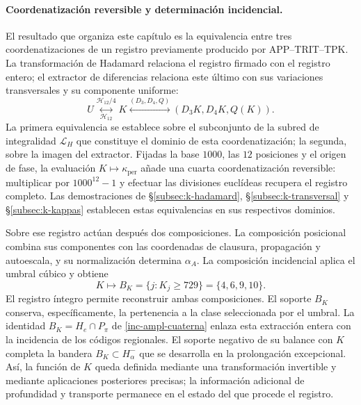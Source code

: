\paragraph{Coordenatización reversible y determinación incidencial.}
\label{ampl-alfa-k-intro-reversible}
El resultado que organiza este capítulo es la equivalencia entre tres
coordenatizaciones de un registro previamente producido por
APP--TRIT--TPK. La transformación de Hadamard relaciona el registro
firmado con el registro entero; el extractor de diferencias relaciona
este último con sus variaciones transversales y su componente uniforme:
\[
 U\underset{\mathcal H_{12}}{\overset{\mathcal H_{12}/4}{\longleftrightarrow}}K
 \overset{(D_3,D_4,Q)}{\longleftrightarrow}
 (D_3K,D_4K,Q(K)).
\]
La primera equivalencia se establece sobre el subconjunto de la subred de
integralidad $\mathcal L_H$ que constituye el dominio de esta coordenatización; la
segunda, sobre la imagen del extractor. Fijadas la
base $1000$, las $12$ posiciones y el origen de fase, la evaluación
$K\mapsto\kappa_{\mathrm{per}}$ añade una cuarta coordenatización
reversible: multiplicar por $1000^{12}-1$ y efectuar las divisiones
euclídeas recupera el registro completo. Las demostraciones de
\S\ref{subsec:k-hadamard}, \S\ref{subsec:k-transversal} y
\S\ref{subsec:k-kappas} establecen estas equivalencias en sus respectivos
dominios.

Sobre ese registro actúan después dos composiciones. La composición
posicional combina sus componentes con las coordenadas de clausura,
propagación y autoescala, y su normalización determina $\alpha_A$. La
composición incidencial aplica el umbral cúbico y obtiene
\[
 K\longmapsto B_K=\{j:K_j\geq729\}=\{4,6,9,10\}.
\]
El registro íntegro permite reconstruir ambas composiciones. El soporte
$B_K$ conserva, específicamente, la pertenencia a la clase seleccionada
por el umbral. La identidad $B_K=H_e\cap P_\pi$ de
\eqref{inc-ampl-cuaterna} enlaza esta extracción entera con la incidencia
de los códigos regionales. El soporte negativo de su balance con $K$
completa la bandera $B_K\subset H^-_\alpha$ que se desarrolla en la
prolongación excepcional. Así, la función de $K$ queda definida mediante
una transformación invertible y mediante aplicaciones posteriores
precisas; la información adicional de profundidad y transporte permanece
en el estado del que procede el registro.
